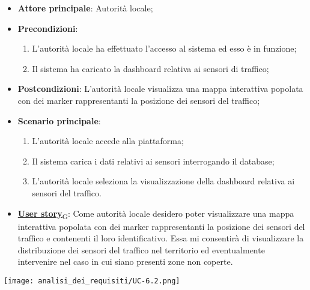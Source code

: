 \begin{itemize}
	\item \textbf{Attore principale}: Autorità locale;
	\item \textbf{Precondizioni}:
	      \begin{enumerate}
		      \item L'autorità locale ha effettuato l'accesso al sistema ed esso è in funzione;
		      \item Il sistema ha caricato la dashboard relativa ai sensori di traffico;
	      \end{enumerate}
	\item \textbf{Postcondizioni}: L'autorità locale visualizza una mappa interattiva popolata con dei marker rappresentanti la posizione dei sensori del traffico;
	\item \textbf{Scenario principale}:
	      \begin{enumerate}
		      \item L'autorità locale accede alla piattaforma;
		      \item Il sistema carica i dati relativi ai sensori interrogando il database;
		      \item L'autorità locale seleziona la visualizzazione della dashboard relativa ai sensori del traffico.
	      \end{enumerate}
	\item \href{https://7last.github.io/docs/rtb/documentazione-interna/glossario\#user-story}{\textbf{User story}\textsubscript{G}}:
	      Come autorità locale desidero poter visualizzare una mappa interattiva popolata con dei marker rappresentanti la posizione dei sensori del traffico
	      e contenenti il loro identificativo. Essa mi consentirà di visualizzare la distribuzione dei sensori del traffico nel territorio ed eventualmente intervenire nel caso in cui siano presenti zone non coperte.
\end{itemize}
\begin{center}
	\texttt{[image: analisi\_dei\_requisiti/UC-6.2.png]}
\end{center}


